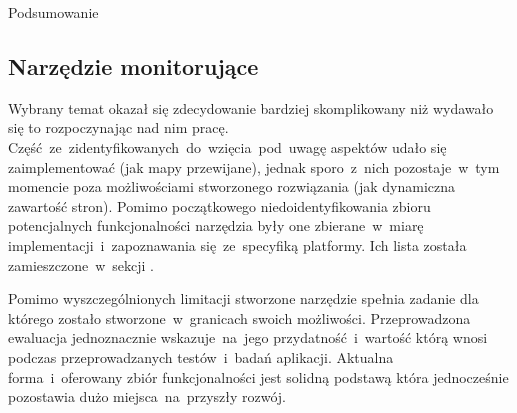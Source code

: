 \begin{chapter}{Podsumowanie}
	\subsection{Narzędzie monitorujące}
	Wybrany temat okazał się zdecydowanie bardziej skomplikowany niż wydawało się to rozpoczynając nad nim pracę. Część~ze~zidentyfikowanych~do~wzięcia~pod~uwagę aspektów udało się zaimplementować (jak mapy przewijane), jednak sporo~z~nich pozostaje~w~tym momencie poza możliwościami stworzonego rozwiązania (jak dynamiczna zawartość stron). Pomimo początkowego niedoidentyfikowania zbioru potencjalnych funkcjonalności narzędzia były one zbierane~w~miarę implementacji~i~zapoznawania się~ze~specyfiką platformy. Ich lista została zamieszczone~w~sekcji .
	
	Pomimo wyszczególnionych limitacji stworzone narzędzie spełnia zadanie dla którego zostało stworzone~w~granicach swoich możliwości. Przeprowadzona ewaluacja jednoznacznie wskazuje~na~jego przydatność~i~wartość którą wnosi  podczas przeprowadzanych testów~i~badań aplikacji. Aktualna forma~i~oferowany zbiór funkcjonalności jest solidną podstawą która jednocześnie pozostawia dużo miejsca~na~przyszły rozwój.
	
\end{chapter}
